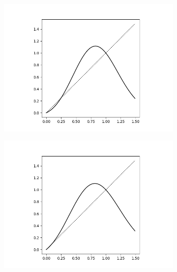 \documentclass{article}
\theoremstyle{definition}
\numberwithin{equation}{section}
\begin{document}
\begin{figure}
     \centering
     \begin{subfigure}[b]{0.45\textwidth}
      \centering
      \includegraphics[width=\textwidth]{figures/fig3_growth1.png}
      \caption{}
  \end{subfigure}
  \begin{subfigure}[b]{0.45\textwidth}
      \centering
      \includegraphics[width=\textwidth]{figures/fig3_growth2.png}
      \caption{}
  \end{subfigure}
     \begin{subfigure}[b]{0.45\textwidth}
         \centering

\end{subfigure}
\end{figure}
\end{document}
